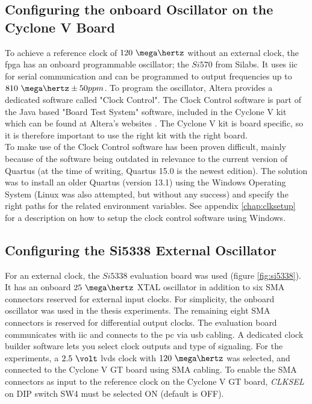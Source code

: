 \documentclass[main.tex]{subfiles}
\begin{document}
\subsection{Configuring the onboard Oscillator on the Cyclone V Board} \label{sec:inclk}

To achieve a reference clock of $120~\mega\hertz$ without an external clock, the \gls{fpga} has an onboard programmable oscillator; the $Si570$ from Silabs. It uses \gls{iic} for serial communication and can be programmed to output frequencies up to $810~\mega\hertz \pm 50 ppm$. To program the oscillator, Altera provides a dedicated software called "Clock Control". The Clock Control software is part of the Java based "Board Test System" software, included in the Cyclone V kit which can be found at Altera's websites \cite{altera_cyclonekit}. The Cyclone V kit is board specific, so it is therefore important to use the right kit with the right board.\\

To make use of the Clock Control software has been proven difficult, mainly because of the software being outdated in relevance to the current version of Quartus (at the time of writing, Quartus 15.0 is the newest edition). The solution was to install an older Quartus (version 13.1) using the Windows Operating System (Linux was also attempted, but without any success) and specify the right paths for the related environment variables. See appendix \ref{chap:clksetup} for a description on how to setup the clock control software using Windows.

\subsection{Configuring the Si5338 External Oscillator} \label{sec:exclk}

For an external clock, the $Si5338$ evaluation board was used (figure \ref{fig:si5338}). It has an onboard $25~\mega\hertz$ XTAL oscillator in addition to six SMA connectors reserved for external input clocks. For simplicity, the onboard oscillator was used in the thesis experiments. The remaining eight SMA connectors is reserved for differential output clocks. The evaluation board communicates with \gls{iic} and connects to the \gls{pc} via \gls{usb} cabling. A dedicated clock builder software \cite{siclk} lets you select clock outputs and type of signaling. For the experiments, a $2.5~\volt$ \gls{lvds} clock with $120~\mega\hertz$ was selected, and connected to the Cyclone V GT board using SMA cabling. To enable the SMA connectors as input to the reference clock on the Cyclone V GT board, \textit{CLKSEL} on DIP switch SW4 must be selected ON (default is OFF).
\end{document}

